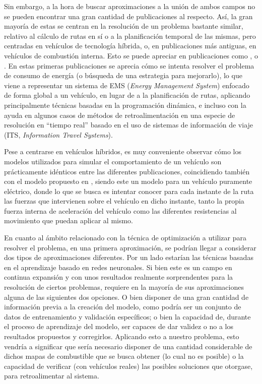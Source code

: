 \documentclass[11pt,spanish,listoffigures,listoftables]{tfgetsinf}
\begin{document}
Sin embargo, a la hora de buscar aproximaciones a la unión de ambos campos no se pueden encontrar una gran cantidad de publicaciones al respecto. Así, la gran mayoría de estas se centran en la resolución de un problema bastante similar, relativo al cálculo de rutas en sí o a la planificación temporal de las mismas, pero centradas en vehículos de tecnología híbrida, o, en publicaciones más antiguas, en vehículos de combustión interna. Esto se puede apreciar en publicaciones como \cite{Bader13}, \cite{KJSS10} o \cite{EVS26}. En estas primeras publicaciones se aprecia cómo se intenta resolver el problema de consumo de energía (o búsqueda de una estrategia para mejorarlo), lo que viene a representar un sistema de EMS (\textit{Energy Management System}) enfocado de forma global a un vehículo, en lugar de a la planificación de rutas, aplicando principalmente técnicas basadas en la programación dinámica, e incluso con la ayuda en algunos casos de métodos de retroalimentación en una especie de resolución en ``tiempo real'' basado en el uso de sistemas de información de viaje (ITS, \textit{Information Travel Systems}).

Pese a centrarse en vehículos híbridos, es muy conveniente observar cómo los modelos utilizados para simular el comportamiento de un vehículo son prácticamente idénticos entre las diferentes publicaciones, coincidiendo también con el modelo propuesto en \cite{FIORI2016257}, siendo este un modelo para un vehículo puramente eléctrico, donde lo que se busca es intentar conocer para cada instante de la ruta las fuerzas que intervienen sobre el vehículo en dicho instante, tanto la propia fuerza interna de aceleración del vehículo como las diferentes resistencias al movimiento que puedan aplicar al mismo.

En cuanto al ámbito relacionado con la técnica de optimización a utilizar para resolver el problema, en una primera aproximación, se podrían llegar a considerar dos tipos de aproximaciones diferentes. Por un lado estarían las técnicas basadas en el aprendizaje basado en redes neuronales. Si bien este es un campo en continua expansión y con unos resultados realmente sorprendentes para la resolución de ciertos problemas, requiere en la mayoría de sus aproximaciones alguna de las siguientes dos opciones. O bien disponer de una gran cantidad de información previa a la creación del modelo, como podría ser un conjunto de datos de entrenamiento y validación específicos; o bien la capacidad de, durante el proceso de aprendizaje del modelo, ser capaces de dar validez o no a los resultados propuestos y corregirlos. Aplicando esto a nuestro problema, esto vendría a significar que sería necesario disponer de una cantidad considerable de dichos mapas de combustible que se busca obtener (lo cual no es posible) o la capacidad de verificar (con vehículos reales) las posibles soluciones que otorgase, para retroalimentar al sistema.
\end{document}
